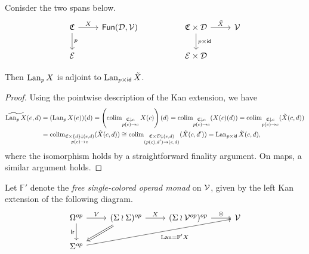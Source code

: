 \documentclass[a4paper,10pt
,draft
]{article}%
\renewcommand{\1}{\ensuremath{\mathbb{id}}}
\begin{document}
\begin{lemma}
      \label{SPAN_LAN_LEM}
      Conisder the two spans below.
      \begin{equation}
            \begin{tikzcd}
                  \C \arrow[d, "p"] \arrow[r, "X"]
                  &
                  \mathsf{Fun}(\mathcal D, \V)
                  &&
                  \C \times \mathcal D \arrow[d, "p \times \mathsf{id}"] \arrow[r, "\tilde X"]
                  &
                  \V
                  \\
                  \mathcal E
                  &
                  &&
                  \mathcal E \times \mathcal D
            \end{tikzcd}
      \end{equation}
      
      Then $\operatorname{Lan}_p X$ is adjoint to $\operatorname{Lan}_{p \times \mathsf{id}} \tilde X$. 
\end{lemma}
\begin{proof}
      Using the pointwise description of the Kan extension, we have
      \begin{align}
        \widetilde{\operatorname{Lan}_p X}(e,d)
        &= (\operatorname{Lan}_p X(e))(d)
          = \left(
          \operatorname{colim}\limits_{\substack{ \mathfrak C \downarrow e \\ p(c) \to e}} X(c)
        \right)(d)
        = \operatorname{colim}\limits_{\substack{ \mathfrak C \downarrow e \\ p(c) \to e}}(X(c)(d))
        = \operatorname{colim}\limits_{\substack{ \mathfrak C \downarrow e \\ p(c) \to e}}(\tilde X(c,d))\\
        &= \operatorname{colim}\limits_{\substack{ \mathfrak C \times \left\{d\right\} \downarrow (e,d) \\ p(c) \to e}}(\tilde X(c,d))
        \cong \operatorname{colim}\limits_{\substack{ \mathfrak C \times \mathcal D \downarrow (e,d) \\ (p(c),d') \to (e,d)}}(\tilde X(c,d'))
        = \operatorname{Lan}_{p \times \mathsf{id}}\tilde X(c,d),
      \end{align}
      where the isomorphism holds by a straightforward finality argument.
      On maps, a similar argument holds.
\end{proof}

\begin{notation}[\cite{BP17}]
      Let $\mathbb F'$ denote the \textit{free single-colored operad monad} on $\mathcal V$, given by the left Kan extension of the following diagram.
      \begin{equation}
            \begin{tikzcd}
                  \Omega^{op}
                  \arrow[d, "\mathsf{lr}"']
                  \arrow[r, "V"]
                  &
                  (\Sigma \wr \Sigma)^{op} \arrow[r, "X"]
                  \arrow[dl, Rightarrow]
                  &
                  (\Sigma \wr \V^{op})^{op} \arrow[r, "\otimes"]
                  &
                  \V
                  \\
                  \Sigma^{op} \arrow[urrr, "\Lan = \mathbb F' X"']
            \end{tikzcd}
      \end{equation}
\end{notation}
\end{document}
